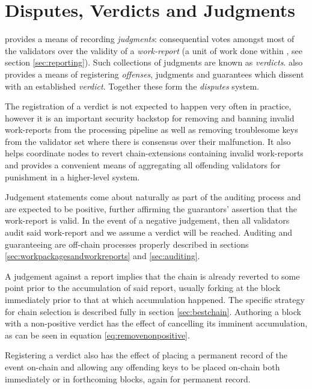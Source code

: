 \section{Disputes, Verdicts and Judgments}\label{sec:disputes}

\newcommand*{\verdicts}{\mathbf{V}}
\newcommand*{\xtverdicts}{\mathbf{v}}
\newcommand*{\xtculprits}{\mathbf{c}}
\newcommand*{\xtfaults}{\mathbf{f}}

\Jam provides a means of recording \emph{judgments}: consequential votes amongst most of the validators over the validity of a \emph{work-report} (a unit of work done within \Jam, see section \ref{sec:reporting}). Such collections of judgments are known as \emph{verdicts}. \Jam also provides a means of registering \emph{offenses}, judgments and guarantees which dissent with an established \emph{verdict}. Together these form the \emph{disputes} system.

The registration of a verdict is not expected to happen very often in practice, however it is an important security backstop for removing and banning invalid work-reports from the processing pipeline as well as removing troublesome keys from the validator set where there is consensus over their malfunction. It also helps coordinate nodes to revert chain-extensions containing invalid work-reports and provides a convenient means of aggregating all offending validators for punishment in a higher-level system.

Judgement statements come about naturally as part of the auditing process and are expected to be positive, further affirming the guarantors' assertion that the work-report is valid. In the event of a negative judgement, then all validators audit said work-report and we assume a verdict will be reached. Auditing and guaranteeing are off-chain processes properly described in sections \ref{sec:workpackagesandworkreports} and \ref{sec:auditing}.

A judgement against a report implies that the chain is already reverted to some point prior to the accumulation of said report, usually forking at the block immediately prior to that at which accumulation happened. The specific strategy for chain selection is described fully in section \ref{sec:bestchain}. Authoring a block with a non-positive verdict has the effect of cancelling its imminent accumulation, as can be seen in equation \ref{eq:removenonpositive}.

Registering a verdict also has the effect of placing a permanent record of the event on-chain and allowing any offending keys to be placed on-chain both immediately or in forthcoming blocks, again for permanent record.

